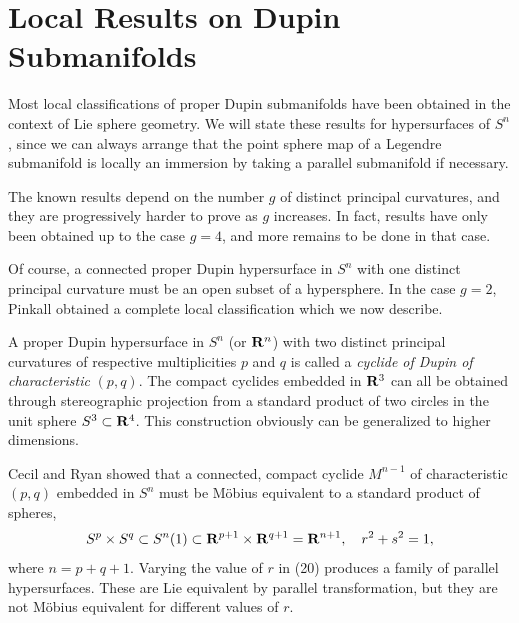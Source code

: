 \documentclass[12pt]{article}
\begin{document}
{\section{Local Results on Dupin Submanifolds}
\label{sec:local-dupin}

Most local classifications of proper Dupin submanifolds have 
been obtained in the context of Lie sphere geometry.  We will state
these results for hypersurfaces of $S^n$, since we can
always arrange that the point sphere map of a Legendre submanifold
is locally an immersion by taking a parallel submanifold if
necessary.  

The known results depend on the number $g$ of
distinct principal curvatures, and they are progressively harder
to prove as $g$ increases.  In fact, results have only been
obtained up to the case $g=4$, and more remains to be done
in that case.  

Of course, 
a connected proper Dupin hypersurface in $S^n$ 
with one distinct principal curvature must be an open
subset of a hypersphere.  
In the case $g=2$, Pinkall \cite{P2} obtained a complete local classification which we now describe.

A proper Dupin hypersurface in $S^n$ (or ${\bf R}^n$)
with two distinct principal curvatures of respective 
multiplicities $p$ and $q$ is called a
{\em cyclide of Dupin of characteristic} $(p,q)$.
The compact cyclides embedded in ${\bf R}^3$ can all be obtained
through stereographic projection from a standard product of two
circles in the unit sphere $S^3 \subset {\bf R}^4$.  This
construction obviously can be generalized to higher dimensions.

Cecil and Ryan \cite{CRMA} showed that a connected, compact
cyclide $M^{n-1}$ of characteristic $(p,q)$ embedded in
$S^n$ must be M\"{o}bius equivalent to a standard product of spheres,
\begin{equation}
\label{eq:standard-product-spheres}
S^p \times S^q \subset S^n (1) \subset {\bf R}^{p+1}
\times {\bf R}^{q+1} = {\bf R}^{n+1}, \quad r^2 + s^2 = 1,
\end{equation}
where $n = p+q+1$.  Varying the value of $r$ in (20) produces
a family of parallel hypersurfaces.  These are Lie equivalent
by parallel transformation, but they are not M\"{o}bius equivalent
for different values of $r$.

}
\end{document}
